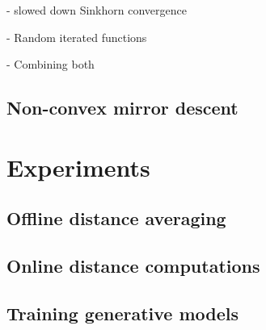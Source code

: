 - slowed down Sinkhorn convergence

- Random iterated functions

- Combining both

\subsection{Non-convex mirror descent}

\section{Experiments}

\subsection{Offline distance averaging}

\subsection{Online distance computations}

\subsection{Training generative models}



